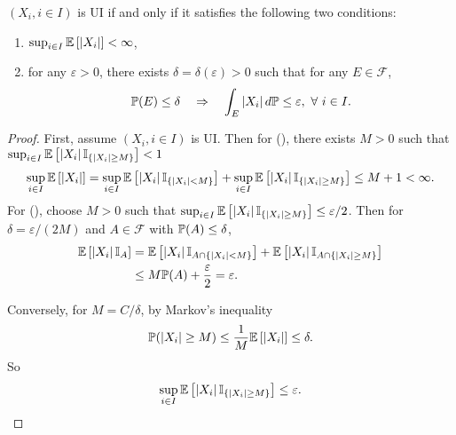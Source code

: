 \begin{thm}
    $(X_i,i\in I)$ is UI if and only if it satisfies the following two conditions:
    \begin{enumerate}[label=(\arabic{*})]
        \item $\sup_{i\in I}\mathbb{E}\left[\left\lvert X_i\right\lvert\right] < \infty$,
        \item for any $\varepsilon > 0$, there exists $\delta = \delta(\varepsilon) > 0$ such that for any $E \in \mathcal{F}$,
        \begin{equation*}
            \mathbb{P}(E) \leq \delta \quad \Rightarrow \quad \int_E \left\lvert X_i\right\lvert d\mathbb{P} \leq \varepsilon,~\forall~i\in I.
        \end{equation*}
    \end{enumerate}
\end{thm}
\begin{proof}
    First, assume $(X_i,i\in I)$ is UI. Then for (), there exists $M > 0$ such that $\sup_{i\in I}\mathbb{E}\left[\left\lvert X_i\right\lvert\mathbb{I}_{\left\{\left\lvert X_i\right\lvert \geq M\right\}}\right] < 1$
    \begin{equation*}
         \sup_{i\in I}\mathbb{E}\left[\left\lvert X_i\right\lvert\right] = \sup_{i\in I}\mathbb{E}\left[\left\lvert X_i\right\lvert\mathbb{I}_{\left\{\left\lvert X_i\right\lvert < M\right\}}\right] +\sup_{i\in I}\mathbb{E}\left[\left\lvert X_i\right\lvert\mathbb{I}_{\left\{\left\lvert X_i\right\lvert \geq M\right\}}\right] \leq M + 1 < \infty.
    \end{equation*}
    For (), choose $M > 0$ such that $\sup_{i\in I}\mathbb{E}\left[\left\lvert X_i\right\lvert\mathbb{I}_{\left\{\left\lvert X_i\right\lvert \geq M\right\}}\right] \leq \varepsilon / 2$. Then for $\delta = \varepsilon / (2M)$ and $A \in \mathcal{F}$ with $\mathbb{P}(A) \leq \delta$,
    \begin{align*}
        \mathbb{E}\left[\left\lvert X_i\right\lvert\mathbb{I}_A\right] &= \mathbb{E}\left[\left\lvert X_i\right\lvert\mathbb{I}_{A\cap \left\{\left\lvert X_i\right\lvert < M\right\}}\right] + \mathbb{E}\left[\left\lvert X_i\right\lvert\mathbb{I}_{A \cap \left\{\left\lvert X_i\right\lvert \geq M\right\}}\right] \\
        &\leq M\mathbb{P}(A) + \frac{\varepsilon}{2} = \varepsilon.
    \end{align*}

    \noindent Conversely, for $M = C / \delta$, by Markov's inequality
    \begin{equation*}
        \mathbb{P}(\left\lvert X_i\right\lvert \geq M) \leq \frac{1}{M}\mathbb{E}\left[\left\lvert X_i\right\lvert\right] \leq \delta.
    \end{equation*}
    So
    \begin{equation*}
        \sup_{i \in I}\mathbb{E}\left[\left\lvert X_i\right\lvert \mathbb{I}_{\left\{\left\lvert X_i\right\lvert \geq M\right\}}\right] \leq \varepsilon.\qedhere
    \end{equation*}
\end{proof}



